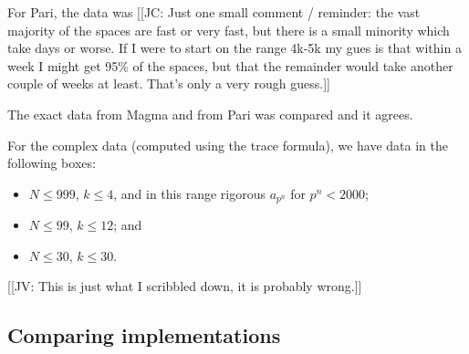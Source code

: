 \documentclass[11pt]{amsart}
\numberwithin{equation}{subsection}
\theoremstyle{plain}
\theoremstyle{definition}
\newcommand{\jv}[1]{{\color{red} \textsf{[[JV: #1]]}}}
\newcommand{\jc}[1]{{\color{orange} \textsf{[[JC: #1]]}}}
\begin{document}
For Pari, the data was \jc{Just one small comment / reminder: the vast majority of the spaces are fast or very fast, but there is a small minority which take days or worse.  If I were to start on the range 4k-5k my gues is that within a week I might get 95\% of the spaces, but that the remainder would take another couple of weeks at least.  That's only a very rough guess.}

\begin{comment}
I finished weight 1 to level 2000, data uploaded.  Approximately twice as much stuff as for 1-1000.  Here are the stats (for level ranges 1-1000 and 1001-2000 separately; the files are about 24 and 56 mb):

sage: gdata1 = read_dtp("mfdata_wt1_1000.gp.txt")
Read 26852 spaces of which 1368 are nontrivial; 2130 Galois orbits.
2088 orbits have dimension <=20
largest three dimsensions: [42, 46, 52]
Total time = 155525.304
Max time = 1869.929 for space (975, 1, 62)
Average time (all spaces)      = 5.792
Average time (nonzero spaces)  = 47.931

sage: gdata2 = read_dtp("mfdata_wt1_1001-2000.gp.txt")
Read 47348 spaces of which 2287 are nontrivial; 4309 Galois orbits.
4050 orbits have dimension <=20
largest three dimsensions: [106, 112, 130]
Total time = 1592922.855
Max time = 29630.354 for space (1950, 1, 63)
Average time (all spaces)      = 33.643
Average time (nonzero spaces)  = 210.930

The bulk of the weight>1 for Nk^2 up to 2000 are done, but as usual a few hard cases are holding things up (some have been running 70h).  I did write to Karim but have had no reply yet.

John
\end{comment}

The exact data from Magma and from Pari was compared and it agrees.

For the complex data (computed using the trace formula), we have data in the following boxes:
\begin{itemize}
\item $N \leq 999$, $k \leq 4$, and in this range rigorous $a_{p^n}$ for $p^n < 2000$;
\item $N \leq 99$, $k \leq 12$; and
\item $N \leq 30$, $k \leq 30$.
\end{itemize}
\jv{This is just what I scribbled down, it is probably wrong.}

\subsection{Comparing implementations}
\end{document}
